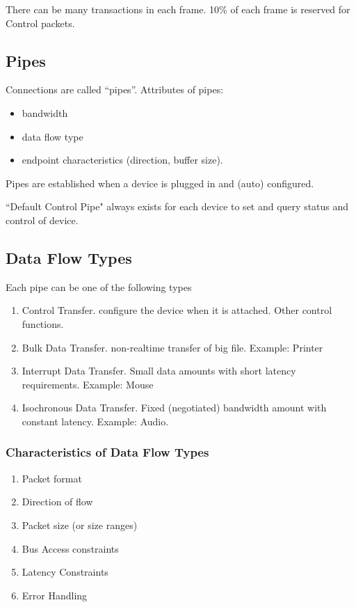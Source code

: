 \documentclass{article}	%
\begin{document}
There can be many transactions in each frame.   10\%
of each frame is reserved for Control packets.

\subsection{Pipes}
Connections are called ``pipes''.  Attributes of pipes:
\begin{itemize}
     \item bandwidth
     \item data flow  type
     \item endpoint characteristics (direction, buffer
     size).
\end{itemize}

Pipes are established when a device is plugged in and (auto)
configured.

``Default Control Pipe" always exists for each device to
set and query status and control of device.

\subsection{Data Flow Types}
Each pipe can be one of the following types
\begin{enumerate}
        \item Control Transfer. configure the device when
        it is attached.  Other control functions.
        \item Bulk Data Transfer. non-realtime transfer
        of big file.  Example: Printer
        \item Interrupt Data Transfer.  Small data amounts
        with short latency requirements. Example: Mouse
        \item Isochronous Data Transfer. Fixed (negotiated)
        bandwidth amount with constant latency. Example:
        Audio.
\end{enumerate}

\subsubsection{Characteristics of Data Flow Types}
\begin{enumerate}
	\item Packet format
	\item Direction of flow
	\item Packet size (or size ranges)
	\item Bus Access constraints
	\item Latency Constraints
	\item Error Handling
\end{enumerate}
\end{document}
